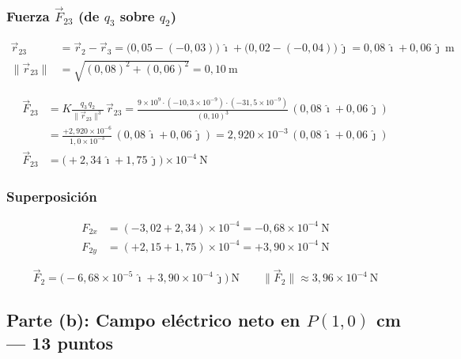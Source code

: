 \documentclass[12pt,letterpaper]{article}
\begin{document}
\subsubsection*{Fuerza $\vec{F}_{23}$ (de $q_3$ sobre $q_2$)}

\begin{align*}
    \vec{r}_{23} &= \vec{r}_2 - \vec{r}_3
        = \bigl(0{,}05-(-0{,}03)\bigr)\,\hat{\imath} + \bigl(0{,}02-(-0{,}04)\bigr)\,\hat{\jmath}
        = 0{,}08\,\hat{\imath} + 0{,}06\,\hat{\jmath}\ \text{m}\\
    \|\vec{r}_{23}\| &= \sqrt{(0{,}08)^2+(0{,}06)^2} = 0{,}10\ \text{m}
\end{align*}

\begin{align*}
    \vec{F}_{23} &= K\frac{q_3\,q_2}{\|\vec{r}_{23}\|^3}\,\vec{r}_{23}
    = \frac{9\times10^9\cdot(-10{,}3\times10^{-9})\cdot(-31{,}5\times10^{-9})}{(0{,}10)^3}
      \,(0{,}08\,\hat{\imath} + 0{,}06\,\hat{\jmath})\\[4pt]
    &= \frac{+2{,}920\times10^{-6}}{1{,}0\times10^{-3}}\,(0{,}08\,\hat{\imath}+0{,}06\,\hat{\jmath})
    = 2{,}920\times10^{-3}\,(0{,}08\,\hat{\imath}+0{,}06\,\hat{\jmath})\\[4pt]
    \vec{F}_{23} &= \bigl(+2{,}34\,\hat{\imath} + 1{,}75\,\hat{\jmath}\bigr)\times10^{-4}\ \text{N}
\end{align*}

\subsubsection*{Superposición}

\begin{align*}
    F_{2x} &= (-3{,}02 + 2{,}34)\times10^{-4} = -0{,}68\times10^{-4}\ \text{N}\\
    F_{2y} &= (+2{,}15 + 1{,}75)\times10^{-4} = +3{,}90\times10^{-4}\ \text{N}
\end{align*}

\[
\boxed{\vec{F}_2 = \bigl(-6{,}68\times10^{-5}\,\hat{\imath} + 3{,}90\times10^{-4}\,\hat{\jmath}\bigr)\ \text{N}
\qquad \|\vec{F}_2\| \approx 3{,}96\times10^{-4}\ \text{N}}
\]

\newpage
\subsection*{Parte (b): Campo eléctrico neto en $P(1,0)$ cm — 13 puntos}
\end{document}
